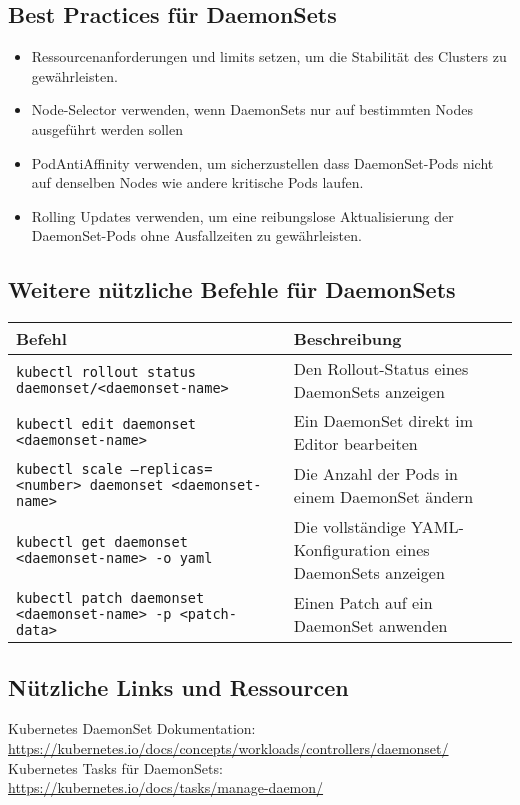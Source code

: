 \subsection{Best Practices für DaemonSets}
\begin{itemize}
    \item Ressourcenanforderungen und limits setzen, um die Stabilität des Clusters zu gewährleisten.
    \item Node-Selector verwenden, wenn DaemonSets nur auf bestimmten Nodes ausgeführt werden sollen
    \item PodAntiAffinity verwenden, um sicherzustellen dass DaemonSet-Pods nicht auf denselben Nodes wie andere kritische Pods laufen.
    \item Rolling Updates verwenden, um eine reibungslose Aktualisierung der DaemonSet-Pods ohne Ausfallzeiten zu gewährleisten.
\end{itemize}
\subsection{Weitere nützliche Befehle für DaemonSets}
\begin{tabular}{|p{}|p{}|}
\hline
\textbf{Befehl} & \textbf{Beschreibung} \\
\hline
\texttt{kubectl rollout status daemonset/<daemonset-name>} & Den Rollout-Status eines DaemonSets anzeigen \\
\texttt{kubectl edit daemonset <daemonset-name>} & Ein DaemonSet direkt im Editor bearbeiten \\
\texttt{kubectl scale --replicas=<number> daemonset <daemonset-name>} & Die Anzahl der Pods in einem DaemonSet ändern \\
\texttt{kubectl get daemonset <daemonset-name> -o yaml} & Die vollständige YAML-Konfiguration eines DaemonSets anzeigen \\
\texttt{kubectl patch daemonset <daemonset-name> -p <patch-data>} & Einen Patch auf ein DaemonSet anwenden \\
\hline
\end{tabular}

\subsection{Nützliche Links und Ressourcen}

Kubernetes DaemonSet Dokumentation:\\
\url{https://kubernetes.io/docs/concepts/workloads/controllers/daemonset/}\\
Kubernetes Tasks für DaemonSets:\\
\url{https://kubernetes.io/docs/tasks/manage-daemon/}\\


